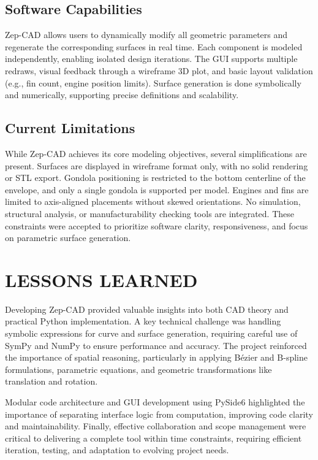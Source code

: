 \documentclass[10pt]{article}
\begin{document}
\subsection{Software Capabilities}

Zep-CAD allows users to dynamically modify all geometric parameters and regenerate the corresponding surfaces in 
real time. Each component is modeled independently, enabling isolated design iterations. The GUI supports 
multiple redraws, visual feedback through a wireframe 3D plot, and basic layout validation (e.g., fin count,
 engine position limits). Surface generation is done symbolically and numerically, supporting precise 
 definitions and scalability.

 \subsection{Current Limitations}

 While Zep-CAD achieves its core modeling objectives, several simplifications are present. Surfaces are 
 displayed in wireframe format only, with no solid rendering or STL export. Gondola positioning is restricted to
  the bottom centerline of the envelope, and only a single gondola is supported per model. Engines and fins are 
  limited to axis-aligned placements without skewed orientations. No simulation, structural analysis, or 
  manufacturability checking tools are integrated. These constraints were accepted to prioritize software 
  clarity, responsiveness, and focus on parametric surface generation.
 

  \section{LESSONS LEARNED}

  Developing Zep-CAD provided valuable insights into both CAD theory and practical Python implementation. A key 
  technical challenge was handling symbolic expressions for curve and surface generation, requiring careful use 
  of SymPy and NumPy to ensure performance and accuracy. The project reinforced the importance of spatial 
  reasoning, particularly in applying Bézier and B-spline formulations, parametric equations, and geometric 
  transformations like translation and rotation.
  
  Modular code architecture and GUI development using PySide6 highlighted the importance of separating interface 
  logic from computation, improving code clarity and maintainability. Finally, effective collaboration and scope 
  management were critical to delivering a complete tool within time constraints, requiring efficient iteration, 
  testing, and adaptation to evolving project needs.
  
\end{document}
